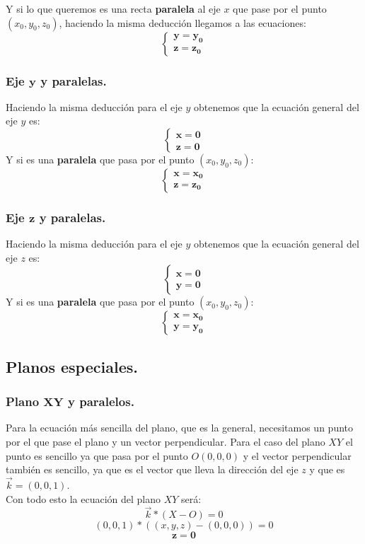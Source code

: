 \documentclass[a4paper,11pt,answers]{exam}
\begin{document}
Y si lo que queremos es una recta \textbf{paralela} al eje $x$ que pase por el punto $(x_0,y_0,z_0)$, haciendo la misma deducción llegamos a las ecuaciones:
\[\boldsymbol{\left\lbrace\begin{array}{l}
y=y_0\\
z=z_0
\end{array}\right.}\]
\subsubsection{Eje $\boldsymbol{y}$ y paralelas.}
Haciendo la misma deducción para el eje $y$ obtenemos que la ecuación general del eje $y$ es:
\[\boldsymbol{\left\lbrace
\begin{array}{l}
x=0\\
z=0
\end{array}\right.}\]
Y si es una \textbf{paralela} que pasa por el punto $(x_0, y_0,z_0)$:
\[\boldsymbol{\left\lbrace
\begin{array}{l}
x=x_0\\
z=z_0
\end{array}\right.}\]
\subsubsection{Eje $\boldsymbol{z}$ y paralelas.}
Haciendo la misma deducción para el eje $y$ obtenemos que la ecuación general del eje $z$ es:
\[\boldsymbol{\left\lbrace
\begin{array}{l}
x=0\\
y=0
\end{array}\right.}\]
Y si es una \textbf{paralela} que pasa por el punto $(x_0, y_0,z_0)$:
\[\boldsymbol{\left\lbrace
\begin{array}{l}
x=x_0\\
y=y_0
\end{array}\right.}\]
\subsection{Planos especiales.}
\subsubsection{Plano $\boldsymbol{XY}$ y paralelos.}
Para la ecuación más sencilla del plano, que es la general, necesitamos un punto por el que pase el plano y un vector perpendicular. Para el caso del plano $XY$ el punto es sencillo ya que pasa por el punto $O(0,0,0)$ y el vector perpendicular también es sencillo, ya que es el vector que lleva la dirección del eje $z$ y que es $\vec k = (0,0,1)$.\\
Con todo esto la ecuación del plano $XY$ será:
\[\vec{k} *(X-O) = 0\]
\[(0,0,1) *((x,y,z) - (0,0,0)) = 0\]
\[\boldsymbol{z = 0}\]
\end{document}
